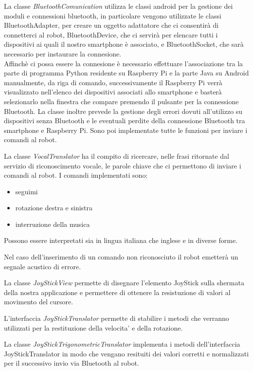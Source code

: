 \documentclass[12pt]{article}
\newcommand{\raspi}{Raspberry Pi}
\begin{document}
\medskip

La classe \emph{BluetoothComunication} utilizza le classi android per la gestione dei moduli e connessioni bluetooth, in particolare
vengono utilizzate le classi BluetoothAdapter, per creare un oggetto adattatore che ci consentirà di connetterci al robot, BluetoothDevice, che ci servirà per elencare tutti i dispositivi ai quali il nostro smartphone è associato, e BluetoothSocket, che sarà necessario per instaurare la connesione.\\
Affinchè ci possa essere la connesione è necessario effettuare l'associazione tra la parte di programma Python residente su \raspi{} e la parte Java su Android manualmente, da riga di comando, successivamente il \raspi{} verrà visualizzato nell'elenco dei dispositivi associati allo smartphone e basterà selezionarlo nella finestra che compare premendo il pulsante per la connessione Bluetooth.
La classe inoltre prevede la gestione degli errori dovuti all'utilizzo su dispositivi senza Bluetooth e le eventuali perdite della connessione Bluetooth tra smartphone e \raspi{}. Sono poi implementate tutte le funzioni per inviare i comandi al robot.

\bigskip

La classe \emph{VocalTranslator} ha il compito di ricercare, nelle frasi ritornate dal servizio di riconoscimento vocale, le parole chiave che ci permettono di inviare i comandi al robot.
I comandi implementati sono:
\begin{itemize}
\item seguimi
\item rotazione destra e sinistra
\item interruzione della musica
\end{itemize}

Possono essere interpretati sia in lingua italiana che inglese e in diverse forme.

Nel caso dell'inserimento di un comando non riconosciuto il robot emetterà un segnale acustico di errore.

\bigskip

La classe \emph{JoyStickView} permette di disegnare l'elemento JoyStick sulla shermata della nostra applicazione e permettere di ottenere la resistuzione di valori al movimento del cursore.

L'interfaccia \emph{JoyStickTranslator} permette di stabilire i metodi che verranno utilizzati per la restituzione della velocita' e della rotazione.

La classe \emph{JoyStickTrigonometricTranslator} implementa i metodi dell'interfaccia JoyStickTranslator in modo che vengano resituiti dei valori corretti e normalizzati per il successivo invio via Bluetooth al robot.
\end{document}
